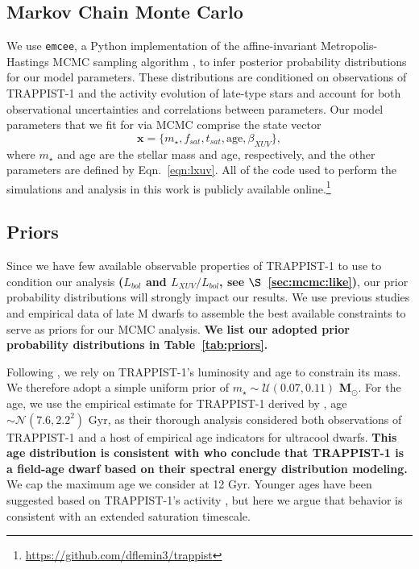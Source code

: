 \documentclass[twocolumn]{aastex62}
\def\gsim{~\rlap{$>$}{\lower 1.0ex\hbox{$\sim$}}}
\newcommand{\xxx}[1]{{\textbf{#1}}}
\begin{document}
\subsection{Markov Chain Monte Carlo} \label{sec:mcmc}

We use \texttt{emcee}, a Python implementation of the affine-invariant Metropolis-Hastings MCMC sampling algorithm \citep{ForemanMackey2013}, to infer posterior probability distributions for our model parameters. These distributions are conditioned on observations of TRAPPIST-1 and the activity evolution of late-type stars and account for both observational uncertainties and correlations between parameters. Our model parameters that we fit for via MCMC comprise the state vector
\begin{equation} \label{eqn:state}
    \textbf{x} = \{m_{\star}, f_{sat}, t_{sat}, \mathrm{age}, \beta_{XUV}\},
\end{equation}
where $m_{\star}$ and age are the stellar mass and age, respectively, and the other parameters are defined by Eqn.~\ref{eqn:lxuv}. All of the code used to perform the simulations and analysis in this work is publicly available online.\footnote{ \href{https://github.com/dflemin3/trappist}{https://github.com/dflemin3/trappist}}

\subsection{Priors} \label{sec:mcmc:priors}

Since we have few available observable properties of TRAPPIST-1 to use to condition our analysis \xxx{($L_{bol}$ and $L_{XUV}/L_{bol}$, see $\S$~\ref{sec:mcmc:like})}, our prior probability distributions will strongly impact our results. We use previous studies and empirical data of late M dwarfs to assemble the best available constraints to serve as priors for our MCMC analysis. \xxx{We list our adopted prior probability distributions in Table~\ref{tab:priors}.}

Following \citet{vanGrootel2018}, we rely on TRAPPIST-1's luminosity and age to constrain its mass. We therefore adopt a simple uniform prior of $m_{\star} \sim \mathcal{U}(0.07, 0.11)$ \xxx{M$_{\odot}$}. For the age, we use the empirical estimate for TRAPPIST-1 derived by \citet{Burgasser2017}, age $\sim \mathcal{N}(7.6, 2.2^2)$ Gyr, as their thorough analysis considered both observations of TRAPPIST-1 and a host of empirical age indicators for ultracool dwarfs. \xxx{This age distribution is consistent with \citet{Gonzales2019} who conclude that TRAPPIST-1 is a field-age dwarf based on their spectral energy distribution modeling.} We cap the maximum age we consider at 12 Gyr. Younger ages have been suggested based on TRAPPIST-1's activity \citep[e.g.~$\gsim 500$ Myr,][]{Bourrier2017b}, but here we argue that behavior is consistent with an extended saturation timescale.
\end{document}
